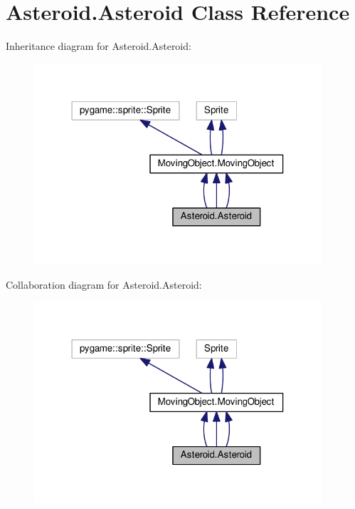 \hypertarget{classAsteroid_1_1Asteroid}{}\section{Asteroid.\+Asteroid Class Reference}
\label{classAsteroid_1_1Asteroid}


Inheritance diagram for Asteroid.\+Asteroid\+:\nopagebreak
\begin{figure}[H]
\begin{center}
\leavevmode
\includegraphics[width=303pt]{classAsteroid_1_1Asteroid__inherit__graph}
\end{center}
\end{figure}


Collaboration diagram for Asteroid.\+Asteroid\+:\nopagebreak
\begin{figure}[H]
\begin{center}
\leavevmode
\includegraphics[width=303pt]{classAsteroid_1_1Asteroid__coll__graph}
\end{center}
\end{figure}
